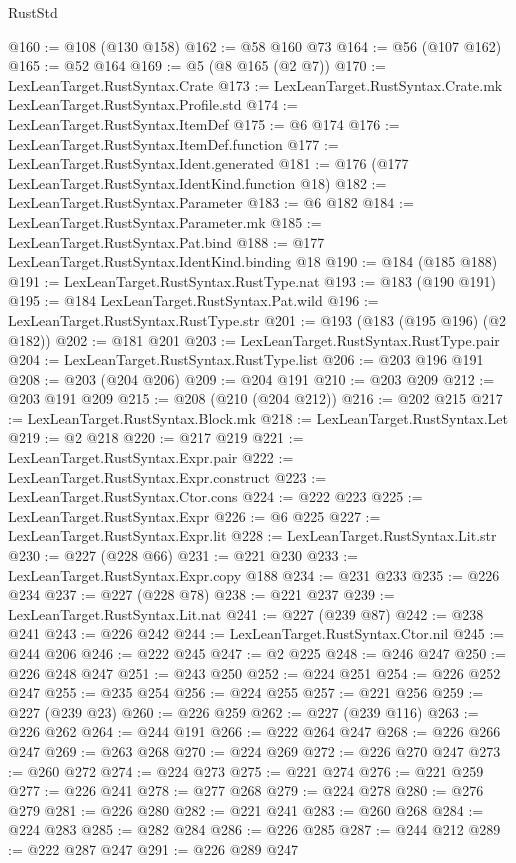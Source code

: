 \begin{lexlean}{RustStd}
\begin{coremodule}
@160 := @108 (@130 @158)
@162 := @58 @160 @73
@164 := @56 (@107 @162)
@165 := @52 @164
@169 := @5 (@8 @165 (@2 @7))
@170 := LexLeanTarget.RustSyntax.Crate
@173 := LexLeanTarget.RustSyntax.Crate.mk LexLeanTarget.RustSyntax.Profile.std
@174 := LexLeanTarget.RustSyntax.ItemDef
@175 := @6 @174
@176 := LexLeanTarget.RustSyntax.ItemDef.function
@177 := LexLeanTarget.RustSyntax.Ident.generated
@181 := @176 (@177 LexLeanTarget.RustSyntax.IdentKind.function @18)
@182 := LexLeanTarget.RustSyntax.Parameter
@183 := @6 @182
@184 := LexLeanTarget.RustSyntax.Parameter.mk
@185 := LexLeanTarget.RustSyntax.Pat.bind
@188 := @177 LexLeanTarget.RustSyntax.IdentKind.binding @18
@190 := @184 (@185 @188)
@191 := LexLeanTarget.RustSyntax.RustType.nat
@193 := @183 (@190 @191)
@195 := @184 LexLeanTarget.RustSyntax.Pat.wild
@196 := LexLeanTarget.RustSyntax.RustType.str
@201 := @193 (@183 (@195 @196) (@2 @182))
@202 := @181 @201
@203 := LexLeanTarget.RustSyntax.RustType.pair
@204 := LexLeanTarget.RustSyntax.RustType.list
@206 := @203 @196 @191
@208 := @203 (@204 @206)
@209 := @204 @191
@210 := @203 @209
@212 := @203 @191 @209
@215 := @208 (@210 (@204 @212))
@216 := @202 @215
@217 := LexLeanTarget.RustSyntax.Block.mk
@218 := LexLeanTarget.RustSyntax.Let
@219 := @2 @218
@220 := @217 @219
@221 := LexLeanTarget.RustSyntax.Expr.pair
@222 := LexLeanTarget.RustSyntax.Expr.construct
@223 := LexLeanTarget.RustSyntax.Ctor.cons
@224 := @222 @223
@225 := LexLeanTarget.RustSyntax.Expr
@226 := @6 @225
@227 := LexLeanTarget.RustSyntax.Expr.lit
@228 := LexLeanTarget.RustSyntax.Lit.str
@230 := @227 (@228 @66)
@231 := @221 @230
@233 := LexLeanTarget.RustSyntax.Expr.copy @188
@234 := @231 @233
@235 := @226 @234
@237 := @227 (@228 @78)
@238 := @221 @237
@239 := LexLeanTarget.RustSyntax.Lit.nat
@241 := @227 (@239 @87)
@242 := @238 @241
@243 := @226 @242
@244 := LexLeanTarget.RustSyntax.Ctor.nil
@245 := @244 @206
@246 := @222 @245
@247 := @2 @225
@248 := @246 @247
@250 := @226 @248 @247
@251 := @243 @250
@252 := @224 @251
@254 := @226 @252 @247
@255 := @235 @254
@256 := @224 @255
@257 := @221 @256
@259 := @227 (@239 @23)
@260 := @226 @259
@262 := @227 (@239 @116)
@263 := @226 @262
@264 := @244 @191
@266 := @222 @264 @247
@268 := @226 @266 @247
@269 := @263 @268
@270 := @224 @269
@272 := @226 @270 @247
@273 := @260 @272
@274 := @224 @273
@275 := @221 @274
@276 := @221 @259
@277 := @226 @241
@278 := @277 @268
@279 := @224 @278
@280 := @276 @279
@281 := @226 @280
@282 := @221 @241
@283 := @260 @268
@284 := @224 @283
@285 := @282 @284
@286 := @226 @285
@287 := @244 @212
@289 := @222 @287 @247
@291 := @226 @289 @247

\end{coremodule}
\end{lexlean}
